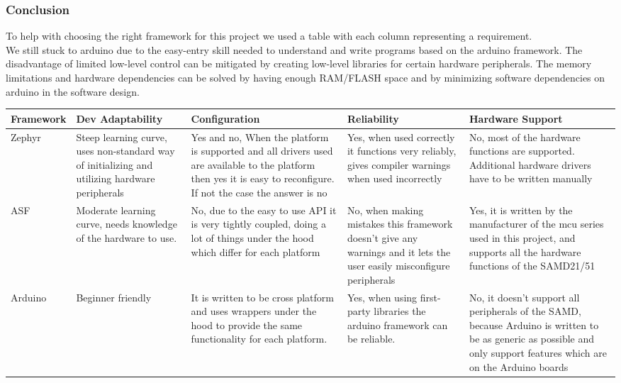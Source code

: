\subsubsection{Conclusion}
To help with choosing the right framework for this project we used a table with each column representing a requirement.\\
We still stuck to arduino due to the easy-entry skill needed to understand and write programs based on the arduino framework. The disadvantage of limited low-level control can be mitigated by creating low-level libraries for certain hardware peripherals. The memory limitations and hardware dependencies can be solved by having enough RAM/FLASH space and by minimizing software dependencies on arduino in the software design.

\begin{center}
\footnotesize
\begin{longtable}{|m{10em}|m{10em}|m{10em}|m{10em}|m{10em}|}
    \hline
    Framework & Dev Adaptability & Configuration & Reliability & Hardware Support \\ \hline
    Zephyr & Steep learning curve, uses non-standard way of initializing and utilizing hardware peripherals & Yes and no, When the platform is supported and all drivers used are available to the platform then yes it is easy to reconfigure. If not the case the answer is no & Yes, when used correctly it functions very reliably, gives compiler warnings when used incorrectly & No, most of the hardware functions are supported. Additional hardware drivers have to be written manually \\ \hline
    ASF & Moderate learning curve, needs knowledge of the hardware to use. & No, due to the easy to use API it is very tightly coupled, doing a lot of things under the hood which differ for each platform & No, when making mistakes this framework doesn't give any warnings and it lets the user easily misconfigure peripherals & Yes, it is written by the manufacturer of the mcu series used in this project, and supports all the hardware functions of the SAMD21/51\\ \hline
    Arduino & Beginner friendly & It is written to be cross platform and uses wrappers under the hood to provide the same functionality for each platform. & Yes, when using first-party libraries the arduino framework can be reliable. & No, it doesn't support all peripherals of the SAMD, because Arduino is written to be as generic as possible and only support features which are on the Arduino boards \\ \hline
\end{longtable}
\end{center}

